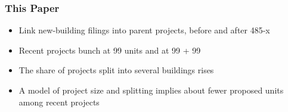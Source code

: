 \begin{frame}
    \frametitle{This Paper}
    \begin{itemize}[itemsep=0.5em]
        \item Link new-building filings into parent projects, before and after 485-x
        \item Recent projects bunch at 99 units and at 99 + 99
        \item The share of projects split into several buildings rises
        \item A model of project size and splitting implies about \MainUnitsLost{} fewer proposed units among recent projects
    \end{itemize}
\end{frame}
